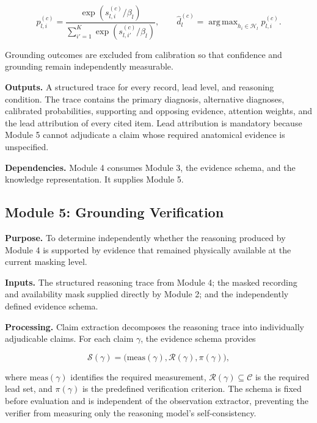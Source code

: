 \documentclass{ssnreview}
\begin{document}
\begin{equation}
  p^{(c)}_{l,i}
  =\frac{\exp(s^{(c)}_{l,i}/\beta_l)}
  {\sum_{i'=1}^{K}\exp(s^{(c)}_{l,i'}/\beta_l)},
  \qquad
  \widehat{d}^{(c)}_l
  =\mathop{\mathrm{arg\,max}}_{h_i\in\mathcal{H}_l}p^{(c)}_{l,i}.
  \label{eq:calibration}
\end{equation}

Grounding outcomes are excluded from calibration so that confidence and grounding remain
independently measurable.

\textbf{Outputs.} A structured trace for every record, lead level, and reasoning condition.
The trace contains the primary diagnosis, alternative diagnoses, calibrated probabilities,
supporting and opposing evidence, attention weights, and the lead attribution of every
cited item. Lead attribution is mandatory because Module 5 cannot adjudicate a claim
whose required anatomical evidence is unspecified.

\textbf{Dependencies.} Module 4 consumes Module 3, the evidence schema, and the
knowledge representation. It supplies Module 5.

\subsection{Module 5: Grounding Verification}

\textbf{Purpose.} To determine independently whether the reasoning produced by
Module 4 is supported by evidence that remained physically available at the current
masking level.

\textbf{Inputs.} The structured reasoning trace from Module 4; the masked recording and
availability mask supplied directly by Module 2; and the independently defined evidence
schema.

\textbf{Processing.} Claim extraction decomposes the reasoning trace into individually
adjudicable claims. For each claim $\gamma$, the evidence schema provides

\begin{equation}
  \mathcal{S}(\gamma)
  =\bigl(\mathrm{meas}(\gamma),\mathcal{R}(\gamma),\pi(\gamma)\bigr),
  \label{eq:evidence-schema}
\end{equation}

where $\mathrm{meas}(\gamma)$ identifies the required measurement,
$\mathcal{R}(\gamma)\subseteq\mathcal{C}$ is the required lead set, and
$\pi(\gamma)$ is the predefined verification criterion. The schema is fixed before
evaluation and is independent of the observation extractor, preventing the verifier from
measuring only the reasoning model’s self-consistency.
\end{document}
